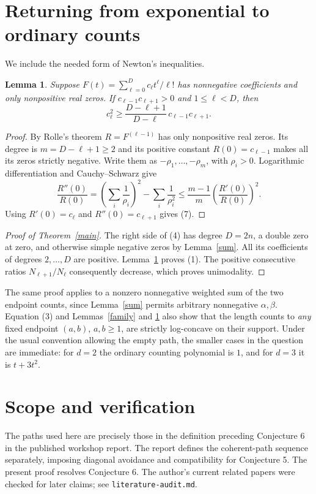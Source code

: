 \documentclass[10pt]{article}
\newtheorem{lemma}[theorem]{Lemma}
\begin{document}
\section{Returning from exponential to ordinary counts}
We include the needed form of Newton's inequalities.
\begin{lemma}\label{newton}
Suppose $F(t)=\sum_{\ell=0}^D c_\ell t^\ell/\ell!$ has nonnegative
coefficients and only nonpositive real zeros. If
$c_{\ell-1}c_{\ell+1}>0$ and $1\le\ell<D$, then
\[
 c_\ell^2\ge
       \frac{D-\ell+1}{D-\ell}\,c_{\ell-1}c_{\ell+1}.   \tag{7}
\]
\end{lemma}
\begin{proof}
By Rolle's theorem $R=F^{(\ell-1)}$ has only nonpositive real zeros.
Its degree is $m=D-\ell+1\ge2$ and its positive constant
$R(0)=c_{\ell-1}$ makes all its zeros strictly negative.
Write them as $-\rho_1,\ldots,-\rho_m$, with $\rho_i>0$.
Logarithmic differentiation and Cauchy--Schwarz give
\[
 \frac{R''(0)}{R(0)}
   =\left(\sum_i\frac1{\rho_i}\right)^2
                            -\sum_i\frac1{\rho_i^2}
 \le\frac{m-1}{m}\left(\frac{R'(0)}{R(0)}\right)^2.
\]
Using $R'(0)=c_\ell$ and $R''(0)=c_{\ell+1}$ gives (7).
\end{proof}

\begin{proof}[Proof of Theorem~\ref{main}]
The right side of (4) has degree $D=2n$, a double zero at zero,
and otherwise simple negative zeros by Lemma~\ref{sum}.
All its coefficients of degrees $2,\ldots,D$ are positive.
Lemma~\ref{newton} proves (1).
The positive consecutive ratios $N_{\ell+1}/N_\ell$ consequently
decrease, which proves unimodality.
\end{proof}

The same proof applies to a nonzero nonnegative weighted sum of the two
endpoint counts, since Lemma~\ref{sum} permits arbitrary nonnegative
$\alpha,\beta$. Equation (3) and Lemmas~\ref{family} and \ref{newton}
also show that the length counts to \emph{any} fixed endpoint $(a,b)$,
$a,b\ge1$, are strictly log-concave on their support.
Under the usual convention allowing the empty path, the smaller
cases in the question are immediate: for $d=2$ the ordinary counting
polynomial is $1$, and for $d=3$ it is $t+3t^2$.

\section{Scope and verification}
The paths used here are precisely those in the definition preceding
Conjecture 6 in the published workshop report. The report defines the
coherent-path sequence separately, imposing diagonal avoidance and
compatibility for Conjecture 5. The present proof resolves Conjecture 6.
The author's current related papers were checked for later claims; see
\texttt{literature-audit.md}.
\end{document}
